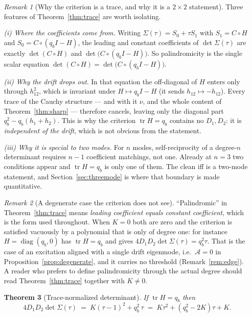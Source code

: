 \documentclass[11pt]{article}
\theoremstyle{plain}
\newtheorem{theorem}{Theorem}
\theoremstyle{definition}
\theoremstyle{remark}
\newtheorem{remark}[theorem]{Remark}
\newcommand{\tr}{\operatorname{tr}}
\newcommand{\Sig}{\Sigma}
\newcommand{\Aco}{\mathcal{A}}
\begin{document}
\begin{remark}[Why the criterion is a trace, and why it is a $2\times2$ statement]\label{rem:whytrace}
Three features of Theorem~\ref{thm:trace} are worth isolating.

\emph{(i) Where the coefficients come from.} Writing $\Sig(\tau)=S_0+\tau S_1$ with
$S_1=C\circ H$ and $S_0=C\circ(q_bI-H)$, the leading and constant coefficients of
$\det\Sig(\tau)$ are exactly $\det(C\circ H)$ and $\det\bigl(C\circ(q_bI-H)\bigr)$. So
palindromicity is the single scalar equation
$\det(C\circ H)=\det\bigl(C\circ(q_bI-H)\bigr)$.

\emph{(ii) Why the drift drops out.} In that equation the off-diagonal of $H$ enters only through
$h_{12}^2$, which is invariant under $H\mapsto q_bI-H$ (it sends $h_{12}\mapsto-h_{12}$). Every
trace of the Cauchy structure --- and with it $\nu$, and the whole content of
Theorem~\ref{thm:sharp} --- therefore cancels, leaving only the diagonal part
$q_b^2-q_b(h_1+h_2)$. This is why the criterion $\tr H=q_b$ contains no $D_1,D_2$: it is
\emph{independent of the drift}, which is not obvious from the statement.

\emph{(iii) Why it is special to two modes.} For $n$ modes, self-reciprocity of a degree-$n$
determinant requires $n-1$ coefficient matchings, not one. Already at $n=3$ two conditions
appear and $\tr H=q_b$ is only one of them. The clean iff is a two-mode statement, and
Section~\ref{sec:threemode} is where that boundary is made quantitative.
\end{remark}

\begin{remark}[A degenerate case the criterion does not see]\label{rem:degenpoly}
``Palindromic'' in Theorem~\ref{thm:trace} means \emph{leading coefficient equals constant
coefficient}, which is the form used throughout. When $K=0$ both are zero and the criterion is
satisfied vacuously by a polynomial that is only of degree one: for instance
$H=\operatorname{diag}(q_b,0)$ has $\tr H=q_b$ and gives
$4D_1D_2\det\Sig(\tau)=q_b^2\tau$. That is the case of an excitation aligned with a single drift
eigenmode, i.e.\ $\Aco=0$ in Proposition~\ref{prop:degenerate}, and it carries no threshold
(Remark~\ref{rem:edge}). A reader who prefers to define palindromicity through the actual degree
should read Theorem~\ref{thm:trace} together with $K\neq0$.
\end{remark}

\begin{theorem}[Trace-normalized determinant]\label{thm:tracenorm}
If $\tr H=q_b$ then
\begin{equation}
  4D_1D_2\det\Sig(\tau) \;=\; K(\tau-1)^2+q_b^2\,\tau
  \;=\; K\tau^2+(q_b^2-2K)\tau+K. \label{eq:tracenorm}
\end{equation}
\end{theorem}
\end{document}
